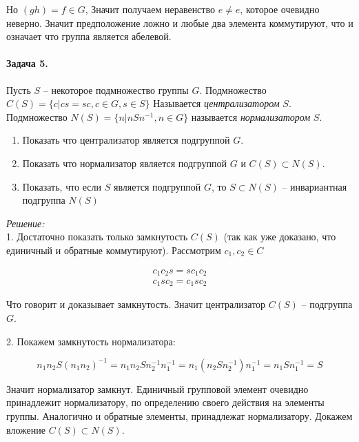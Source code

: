\documentclass[10pt,a4paper]{article}
\begin{document}
	Но $\left(gh\right) = f \in G$, Значит получаем неравенство $e \neq e$,
	которое очевидно неверно. Значит предположение ложно и любые два элемента 
	коммутируют, что и означает что группа является абелевой.
	
	\paragraph{Задача 5.} Пусть $S$ -- некоторое подмножество группы $G$.
	Подмножество $C\left(S\right) = \lbrace c | cs = sc , c \in G, s \in S
	\rbrace$ Называется \textit{централизатором} $S$. Подмножество $N\left(S
	\right) = \lbrace n | nSn^{-1}, n \in G\rbrace$ называется
	\textit{нормализатором} $S$.
	\begin{enumerate}
		\item Показать что централизатор является подгруппой $G$.
		\item Показать что нормализатор является подгруппой $G$ и 
		$C\left(S\right) \subset N\left(S\right)$.
		\item Показать, что если $S$ является подгруппой $G$, то $S \subset
		N\left(S\right)$ -- инвариантная подгруппа $N\left(S\right)$
	\end{enumerate}
	
	\textit{Решение:}\\
	
	1. Достаточно показать только замкнутость $C\left(S\right)$ (так как уже 
	доказано, что единичный и обратные коммутируют). Рассмотрим $c_{1}, c_{2} 
	\in C$
	
	\begin{align}
		\label{eq:ex_5_eq_01}
		c_{1}c_{2}s = sc_{1}c_{2}\\
		\label{eq:ex_5_eq_02}
		c_{1}sc_{2} = c_{1}sc_{2}
	\end{align}
	
	Что говорит и доказывает замкнутость. Значит централизатор $C\left(S\right)$
	-- подгруппа $G$.
	
	2. Покажем замкнутость нормализатора:
	
	\begin{equation}
		\label{eq:ex_5_eq_03}
		n_{1}n_{2}S\left(n_{1}n_{2}\right)^{-1} = 
		n_{1}n_{2}Sn_{2}^{-1}n_{1}^{-1} = 
		n_{1}\left(n_{2}Sn_{2}^{-1}\right)n_{1}^{-1} = 
		n_{1}Sn^{-1}_{1} = S
	\end{equation}
	
	Значит нормализатор замкнут. Единичный групповой элемент очевидно 
	принадлежит нормализатору, по определению своего действия на элементы 
	группы. Аналогично и обратные элементы, принадлежат нормализатору. 
	Докажем вложение $C\left(S\right) \subset N\left(S\right)$.
	
\end{document}
